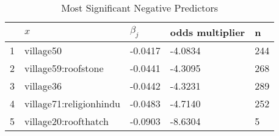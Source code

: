\begin{table}[ht]
\centering
\begin{tabular}{rllll}
  \hline
 & $x$ & $\beta_j$ & odds multiplier & n \\ 
  \hline
1 & village50 & -0.0417 & -4.0834 & 244 \\ 
  2 & village59:roofstone & -0.0441 & -4.3095 & 268 \\ 
  3 & village36 & -0.0442 & -4.3231 & 289 \\ 
  4 & village71:religionhindu & -0.0483 & -4.7140 & 252 \\ 
  5 & village20:roofthatch & -0.0903 & -8.6304 & 5 \\ 
   \hline
\end{tabular}
\caption{Most Significant Negative Predictors} 
\label{tab:neg}
\end{table}
